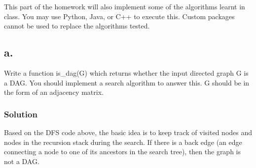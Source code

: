 \documentclass[11pt]{article}
\begin{document}
This part of the homework will also implement some of the algorithms
learnt in class. You may use Python, Java, or C++ to execute this.
Custom packages cannot be used to replace the algorithms tested.

\hypertarget{a.}{%
\subsection{a.}\label{a.}}

Write a function is\_dag(G) which returns whether the input directed
graph G is a DAG. You should implement a search algorithm to answer
this. G should be in the form of an adjacency matrix.

\hypertarget{solution}{%
\subsubsection{Solution}\label{solution}}

Based on the DFS code above, the basic idea is to keep track of visited
nodes and nodes in the recursion stack during the search. If there is a
back edge (an edge connecting a node to one of its ancestors in the
search tree), then the graph is not a DAG.
\end{document}
